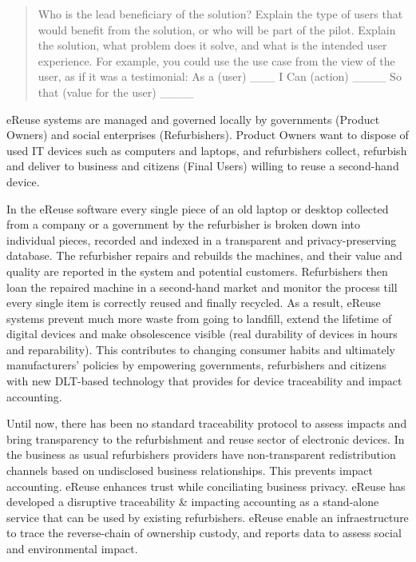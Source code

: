 \documentclass[
]{book}
\begin{document}
\begin{quote}
Who is the lead beneficiary of the solution?
Explain the type of users that would benefit from the solution, or who will be part of the pilot.
Explain the solution, what problem does it solve, and what is the intended user experience.
For example, you could use the use case from the view of the user, as if it was a testimonial:
As a (user) \_\_\_ I Can (action) \_\_\_\_ So that (value for the user) \_\_\_\_
\end{quote}

eReuse systems are managed and governed locally by governments (Product Owners) and social enterprises (Refurbishers). Product Owners want to dispose of used IT devices such as computers and laptops, and refurbishers collect, refurbish and deliver to business and citizens (Final Users) willing to reuse a second-hand device.

In the eReuse software every single piece of an old laptop or desktop collected from a company or a government by the refurbisher is broken down into individual pieces, recorded and indexed in a transparent and privacy-preserving database. The refurbisher repairs and rebuilds the machines, and their value and quality are reported in the system and potential customers. Refurbishers then loan the repaired machine in a second-hand market and monitor the process till every single item is correctly reused and finally recycled. As a result, eReuse systems prevent much more waste from going to landfill, extend the lifetime of digital devices and make obsolescence visible (real durability of devices in hours and reparability). This contributes to changing consumer habits and ultimately manufacturers' policies by empowering governments, refurbishers and citizens with new DLT-based technology that provides for device traceability and impact accounting.

Until now, there has been no standard traceability protocol to assess impacts and bring transparency to the refurbishment and reuse sector of electronic devices. In the business as usual refurbishers providers have non-transparent redistribution channels based on undisclosed business relationships. This prevents impact accounting. eReuse enhances trust while conciliating business privacy. eReuse has developed a disruptive traceability \& impacting accounting as a stand-alone service that can be used by existing refurbishers. eReuse enable an infraestructure to trace the reverse-chain of ownership custody, and reports data to assess social and environmental impact.
\end{document}

